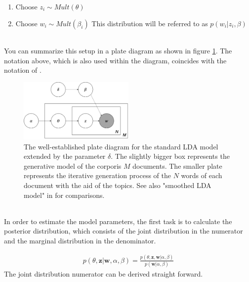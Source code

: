 \documentclass[11pt,a4paper]{article}
\begin{document}
\begin{enumerate}
	\item Choose $z_i \sim Mult(\theta)$
	
	\item Choose $w_i \sim Mult(\beta_i)$ This distribution will be referred to as $p(w_i|z_i,\beta)$
\end{enumerate}
\ \\
You can summarize this setup in a plate diagram as shown in figure \ref{fig:PlateDiagram}. The notation above, which is also used within the diagram, coincides with the notation of \cite{Hornik2011}.\\


\begin{figure}[h]
	\centering
	\includegraphics[width=0.5\textwidth]{LDA_Plate_Diagram.png}
	\caption{The well-established plate diagram for the standard LDA model extended by the parameter $\delta$. The slightly bigger box represents the generative model of the corporis $M$ documents. The smaller plate represents the iterative generation process of the $N$ words of each document with the aid of the topics. See also "smoothed LDA model" in \cite{Blei2003}  for comparisons.}
	\label{fig:PlateDiagram}
\end{figure}
\ \\
In order to estimate the model parameters, the first task is to calculate the posterior distribution, which consists of the joint distribution in the numerator and the marginal distribution in the denominator.

\begin{align}\label{posterior}
p(\theta,\textbf{z}|\textbf{w},\alpha,\beta)= \frac{p(\theta,\textbf{z},\textbf{w}|\alpha,\beta)}
{p(\textbf{w}|\alpha, \beta)}
\end{align}
The joint distribution numerator can be derived straight forward.
\end{document}
